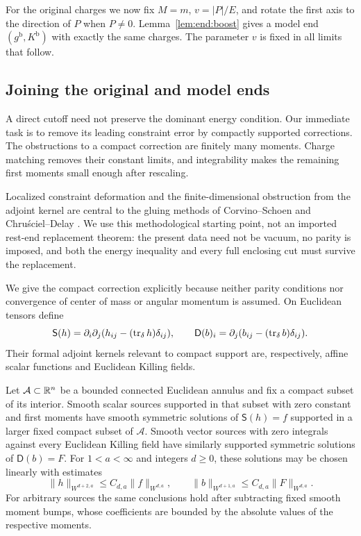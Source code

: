 For the original charges we now fix $M=m$, $v=|P|/E$, and rotate
the first axis to the direction of $P$ when $P\ne0$.
Lemma~\ref{lem:end:boost} gives a model end $(g^{\mathrm b},K^{\mathrm b})$
with exactly the same charges.  The parameter $v$ is fixed in all
limits that follow.

\subsection{Joining the original and model ends}

A direct cutoff need not preserve the dominant energy condition.
Our immediate task is to remove its leading constraint error by
compactly supported corrections.  The obstructions to a compact
correction are finitely many moments.  Charge matching removes their
constant limits, and integrability makes the remaining first moments
small enough after rescaling.

Localized constraint deformation and the finite-dimensional obstruction
from the adjoint kernel are central to the gluing methods of
Corvino--Schoen \cite{CorvinoSchoen2006} and Chru\'sciel--Delay
\cite{ChruscielDelay2003}. We use this methodological starting point,
not an imported rest-end replacement theorem: the present data need
not be vacuum, no parity is imposed, and both the energy inequality
and every full enclosing cut must survive the replacement.

We give the compact correction explicitly because neither parity
conditions nor convergence of center of mass or angular momentum
is assumed.  On Euclidean tensors define
\[
 \mathsf S(h)=\partial_i\partial_j(h_{ij}-(\operatorname{tr}_\delta h)\delta_{ij}),
 \qquad
 \mathsf D(b)_i=\partial_j(b_{ij}-(\operatorname{tr}_\delta b)\delta_{ij}).
\]
Their formal adjoint kernels relevant to compact support are,
respectively, affine scalar functions and Euclidean Killing fields.

\begin{lemma}\label{lem:end:compact-inverses}
Let $\mathcal A\subset\mathbb R^n$ be a bounded connected Euclidean annulus
and fix a compact subset of its interior.
Smooth scalar sources supported in that subset with zero constant
and first moments have smooth symmetric solutions of
$\mathsf S(h)=f$ supported in a larger fixed compact subset of
$\mathcal A$.  Smooth vector sources with zero integrals against
every Euclidean Killing field have similarly supported symmetric
solutions of $\mathsf D(b)=F$.  For $1<a<\infty$ and integers $d\ge0$,
these solutions may be chosen linearly with estimates
\[
 \|h\|_{W^{d+2,a}}\le C_{d,a}\|f\|_{W^{d,a}},\qquad
 \|b\|_{W^{d+1,a}}\le C_{d,a}\|F\|_{W^{d,a}}.
\]
For arbitrary sources the same conclusions hold after subtracting
fixed smooth moment bumps, whose coefficients are bounded by the
absolute values of the respective moments.
\end{lemma}

